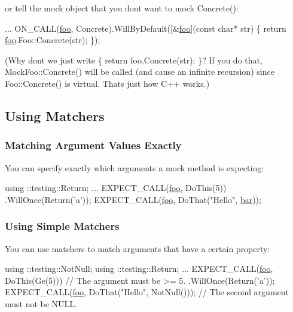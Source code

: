 or tell the mock object that you don\textquotesingle{}t want to mock {\ttfamily Concrete()}\+:


\begin{DoxyCode}
...
  ON\_CALL(\mbox{\hyperlink{namespacefoo}{foo}}, Concrete).WillByDefault([&\mbox{\hyperlink{namespacefoo}{foo}}](\textcolor{keyword}{const} \textcolor{keywordtype}{char}* str) \{
    \textcolor{keywordflow}{return} \mbox{\hyperlink{namespacefoo}{foo}}.Foo::Concrete(str);
  \});
\end{DoxyCode}


(Why don\textquotesingle{}t we just write {\ttfamily \{ return foo.\+Concrete(str); \}}? If you do that, {\ttfamily Mock\+Foo\+::\+Concrete()} will be called (and cause an infinite recursion) since {\ttfamily Foo\+::\+Concrete()} is virtual. That\textquotesingle{}s just how C++ works.)

\subsection*{Using Matchers}

\subsubsection*{Matching Argument Values Exactly}

You can specify exactly which arguments a mock method is expecting\+:


\begin{DoxyCode}
using ::testing::Return;
...
  EXPECT\_CALL(\mbox{\hyperlink{namespacefoo}{foo}}, DoThis(5))
      .WillOnce(Return(\textcolor{charliteral}{'a'}));
  EXPECT\_CALL(\mbox{\hyperlink{namespacefoo}{foo}}, DoThat(\textcolor{stringliteral}{"Hello"}, \mbox{\hyperlink{namespacebar}{bar}}));
\end{DoxyCode}


\subsubsection*{Using Simple Matchers}

You can use matchers to match arguments that have a certain property\+:


\begin{DoxyCode}
using ::testing::NotNull;
using ::testing::Return;
...
  EXPECT\_CALL(\mbox{\hyperlink{namespacefoo}{foo}}, DoThis(Ge(5)))  \textcolor{comment}{// The argument must be >= 5.}
      .WillOnce(Return(\textcolor{charliteral}{'a'}));
  EXPECT\_CALL(\mbox{\hyperlink{namespacefoo}{foo}}, DoThat(\textcolor{stringliteral}{"Hello"}, NotNull()));
      \textcolor{comment}{// The second argument must not be NULL.}
\end{DoxyCode}



